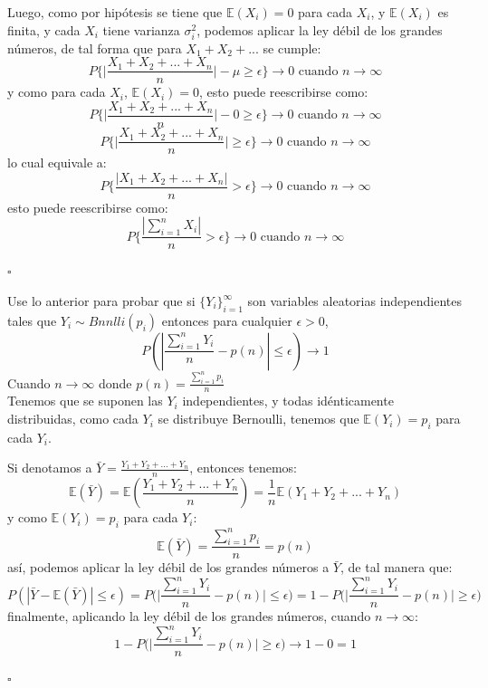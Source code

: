 \documentclass[11pt,a4paper]{report}
\begin{document}
\begin{enumerate}
{		Luego, como por hipótesis se tiene que $\mathbb{E}(X_i) = 0$ para cada 
		$X_i$, y $\mathbb{E}(X_i)$ es finita, y cada $X_i$ tiene varianza $\sigma^2_i$,
		podemos aplicar la ley débil de los grandes números, de tal forma
		que para $X_1 + X_2 + ...$ se cumple:
			$$ P\Big\{ \Big| \frac{X_1 + X_2 + ... + X_n}{n} \Big| - \mu \geq 
			\epsilon \Big\} \rightarrow 0 \text{ cuando } n \rightarrow \infty$$
		y como para cada $X_i$, $\mathbb{E}(X_i) = 0$, esto puede reescribirse como:
			$$ P\Big\{ \Big| \frac{X_1 + X_2 + ... + X_n}{n} \Big| - 0 \geq 
			\epsilon \Big\} \rightarrow 0 \text{ cuando } n \rightarrow \infty$$
			$$ P\Big\{ \Big| \frac{X_1 + X_2 + ... + X_n}{n} \Big| \geq 
			\epsilon \Big\} \rightarrow 0 \text{ cuando } n \rightarrow \infty$$
		lo cual equivale a:
			$$ P\Big\{ \frac{| X_1 + X_2 + ... + X_n |}{n}  > 
			\epsilon \Big\} \rightarrow 0 \text{ cuando } n \rightarrow \infty$$
		esto puede reescribirse como:
			$$ P\Big\{ \frac{| \sum_{i=1}^n X_i |}{n}  > 
			\epsilon \Big\} \rightarrow 0 \text{ cuando } n \rightarrow \infty$$
		\begin{flushright}
			$\square$
		\end{flushright}

	   Use lo anterior para probar que si $\lbrace Y_{i} \rbrace_{i=1}^{\infty}$ son variables aleatorias independientes tales que $Y_{i}\sim Bnnlli(p_{i})$ entonces para cualquier $\epsilon>0$, 
					$$P(|\frac{\sum_{i=1}^{n}Y_{i}}{n}-p(n)|\leq \epsilon)\rightarrow 1$$
	   Cuando $n\rightarrow \infty$ donde $p(n)=\frac{\sum_{i=1}^{n}p_{i}}{n}$\\

	   Tenemos que se suponen las $Y_i$ independientes, y todas idénticamente 
	   distribuidas, como cada $Y_i$ se distribuye Bernoulli, tenemos que 
	   $\mathbb{E}(Y_i) = p_i$ para cada $Y_i$.

	   Si denotamos a $\bar{Y} = \frac{Y_1 + Y_2 + ... + Y_n}{n}$, entonces 
	   tenemos:
			$$ \mathbb{E}(\bar{Y}) = \mathbb{E}(\frac{Y_1 + Y_2 + ... + Y_n}{n})
			   = \frac{1}{n} \mathbb{E}(Y_1 + Y_2 + ... + Y_n)$$
		y como $\mathbb{E}(Y_i) = p_i$ para cada $Y_i$:
			$$ \mathbb{E}(\bar{Y}) = \frac{\sum_{i = 1}^n p_i}{n} = p(n)$$
		así, podemos aplicar la ley débil de los grandes números a $\bar{Y}$, 
		de tal manera que:
			$$P(|\bar{Y} - \mathbb{E}(\bar{Y})| \leq \epsilon) 
			 = P\Big( \Big| \frac{\sum_{i=1}^n Y_i}{n} - p(n)\Big| \leq \epsilon \Big)
			 = 1 - P\Big( \Big| \frac{\sum_{i=1}^n Y_i}{n} - p(n)\Big| \geq \epsilon \Big)$$
		finalmente, aplicando la ley débil de los grandes números, cuando $n \rightarrow \infty$:
			$$ 1 - P\Big( \Big| \frac{\sum_{i=1}^n Y_i}{n} - p(n)\Big| \geq \epsilon \Big)
			  \rightarrow 1 - 0 = 1$$ 
		\begin{flushright}
			$\square$
		\end{flushright}
		}


\end{enumerate}
\end{document}
